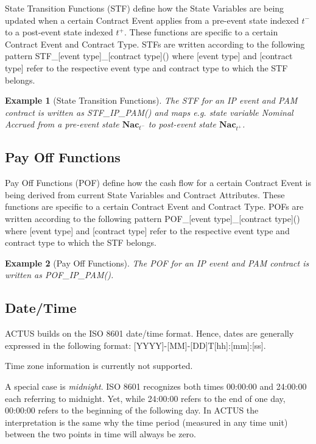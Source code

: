 \documentclass[9pt,oneside]{amsart}
\newtheorem{example}{Example}
\newcommand{\svar}[2]{\textbf{#1}_{#2}}
\newcommand{\stf}[2]{STF\_#1\_#2()}
\newcommand{\pof}[2]{POF\_#1\_#2()}
\begin{document}
\begin{multicols}{2}
State Transition Functions (STF) define how the State Variables are being updated when a certain Contract Event applies from a pre-event state indexed $t^-$ to a post-event state indexed $t^+$. These functions are specific to a certain Contract Event and Contract Type. STFs are written according to the following pattern \stf{[event type]}{[contract type]} where [event type] and [contract type] refer to the respective event type and contract type to which the STF belongs.

\begin{example}[State Transition Functions]
The STF for an IP event and PAM contract is written as \stf{IP}{PAM} and maps e.g. state variable \textit{Nominal Accrued} from a pre-event state $\svar{Nac}{t^-}$ to post-event state $\svar{Nac}{t^+}$.
\end{example}


\subsection{Pay Off Functions}

Pay Off Functions (POF) define how the cash flow for a certain Contract Event is being derived from current State Variables and Contract Attributes. These functions are specific to a certain Contract Event and Contract Type. POFs are written according to the following pattern \pof{[event type]}{[contract type]} where [event type] and [contract type] refer to the respective event type and contract type to which the STF belongs.

\begin{example}[Pay Off Functions]
The POF for an IP event and PAM contract is written as \pof{IP}{PAM}.
\end{example}


\subsection{Date/Time}

ACTUS builds on the ISO 8601 date/time format. Hence, dates are generally expressed in the following format: [YYYY]-[MM]-[DD]T[hh]:[mm]:[ss].

Time zone information is currently not supported.

A special case is \textit{midnight}. ISO 8601 recognizes both times 00:00:00 and 24:00:00 each referring to midnight. Yet, while 24:00:00 refers to the end of one day, 00:00:00 refers to the beginning of the following day. In ACTUS the interpretation is the same why the time period (measured in any time unit) between the two points in time will always be zero. 


\end{multicols}
\end{document}
